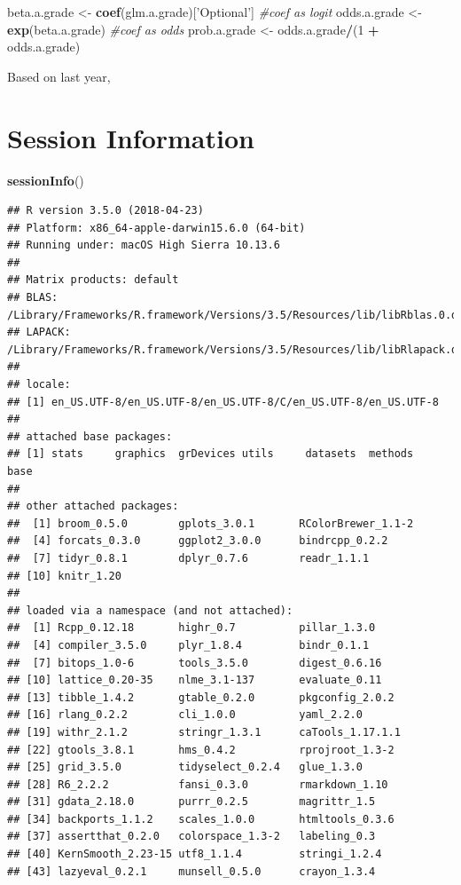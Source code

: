 \documentclass[]{article}
\newenvironment{Shaded}{\begin{snugshade}}{\end{snugshade}}
\newcommand{\KeywordTok}[1]{\textcolor[rgb]{0.13,0.29,0.53}{\textbf{#1}}}
\newcommand{\DecValTok}[1]{\textcolor[rgb]{0.00,0.00,0.81}{#1}}
\newcommand{\StringTok}[1]{\textcolor[rgb]{0.31,0.60,0.02}{#1}}
\newcommand{\CommentTok}[1]{\textcolor[rgb]{0.56,0.35,0.01}{\textit{#1}}}
\newcommand{\OperatorTok}[1]{\textcolor[rgb]{0.81,0.36,0.00}{\textbf{#1}}}
\newcommand{\NormalTok}[1]{#1}
\begin{document}
\begin{Shaded}
\begin{Highlighting}[]
\NormalTok{beta.a.grade <-}\StringTok{ }\KeywordTok{coef}\NormalTok{(glm.a.grade)[}\StringTok{'Optional'}\NormalTok{] }\CommentTok{#coef as logit}
\NormalTok{odds.a.grade <-}\StringTok{ }\KeywordTok{exp}\NormalTok{(beta.a.grade) }\CommentTok{#coef as odds}
\NormalTok{prob.a.grade <-}\StringTok{ }\NormalTok{odds.a.grade}\OperatorTok{/}\NormalTok{(}\DecValTok{1} \OperatorTok{+}\StringTok{ }\NormalTok{odds.a.grade)}
\end{Highlighting}
\end{Shaded}

Based on last year,

\section{Session Information}\label{session-information}

\begin{Shaded}
\begin{Highlighting}[]
\KeywordTok{sessionInfo}\NormalTok{()}
\end{Highlighting}
\end{Shaded}

\begin{verbatim}
## R version 3.5.0 (2018-04-23)
## Platform: x86_64-apple-darwin15.6.0 (64-bit)
## Running under: macOS High Sierra 10.13.6
## 
## Matrix products: default
## BLAS: /Library/Frameworks/R.framework/Versions/3.5/Resources/lib/libRblas.0.dylib
## LAPACK: /Library/Frameworks/R.framework/Versions/3.5/Resources/lib/libRlapack.dylib
## 
## locale:
## [1] en_US.UTF-8/en_US.UTF-8/en_US.UTF-8/C/en_US.UTF-8/en_US.UTF-8
## 
## attached base packages:
## [1] stats     graphics  grDevices utils     datasets  methods   base     
## 
## other attached packages:
##  [1] broom_0.5.0        gplots_3.0.1       RColorBrewer_1.1-2
##  [4] forcats_0.3.0      ggplot2_3.0.0      bindrcpp_0.2.2    
##  [7] tidyr_0.8.1        dplyr_0.7.6        readr_1.1.1       
## [10] knitr_1.20        
## 
## loaded via a namespace (and not attached):
##  [1] Rcpp_0.12.18       highr_0.7          pillar_1.3.0      
##  [4] compiler_3.5.0     plyr_1.8.4         bindr_0.1.1       
##  [7] bitops_1.0-6       tools_3.5.0        digest_0.6.16     
## [10] lattice_0.20-35    nlme_3.1-137       evaluate_0.11     
## [13] tibble_1.4.2       gtable_0.2.0       pkgconfig_2.0.2   
## [16] rlang_0.2.2        cli_1.0.0          yaml_2.2.0        
## [19] withr_2.1.2        stringr_1.3.1      caTools_1.17.1.1  
## [22] gtools_3.8.1       hms_0.4.2          rprojroot_1.3-2   
## [25] grid_3.5.0         tidyselect_0.2.4   glue_1.3.0        
## [28] R6_2.2.2           fansi_0.3.0        rmarkdown_1.10    
## [31] gdata_2.18.0       purrr_0.2.5        magrittr_1.5      
## [34] backports_1.1.2    scales_1.0.0       htmltools_0.3.6   
## [37] assertthat_0.2.0   colorspace_1.3-2   labeling_0.3      
## [40] KernSmooth_2.23-15 utf8_1.1.4         stringi_1.2.4     
## [43] lazyeval_0.2.1     munsell_0.5.0      crayon_1.3.4
\end{verbatim}
\end{document}
